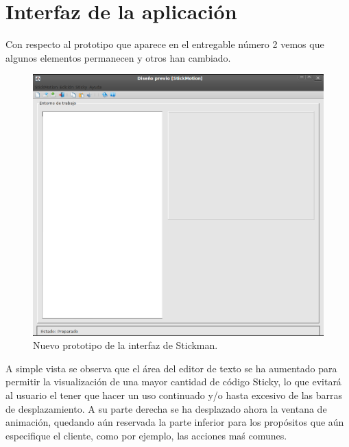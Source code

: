 \documentclass[a4paper,12pt]{article}
\begin{document}
  
  \section{Interfaz de la aplicación}
  Con respecto al prototipo que aparece en el entregable número 2 vemos que algunos elementos permanecen y otros han cambiado.\\

  \begin{figure} [h] \begin{center}
    \includegraphics[height=0.95\textwidth]{Interfaz2}
    \caption{Nuevo prototipo de la interfaz de Stickman.} \label{interfaz}
  \end{center} \end{figure}

  A simple vista se observa que el área del editor de texto se ha aumentado para permitir la visualización de una mayor cantidad de código Sticky,
  lo que evitará al usuario el tener que hacer un uso continuado y/o hasta excesivo de las barras de desplazamiento. A su parte derecha se ha 
  desplazado ahora la ventana de animación, quedando aún reservada la parte inferior para los propósitos que aún especifique el cliente, como por
  ejemplo, las acciones maś comunes.\\
\end{document}
